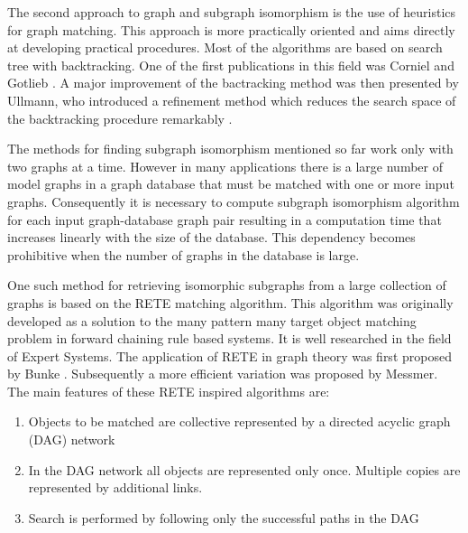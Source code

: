The second approach to graph and subgraph isomorphism is the use of heuristics for graph matching. This approach is more practically oriented and aims 
directly at developing practical procedures. Most of the algorithms are based on search tree with backtracking. One of the first publications in this 
field was Corniel and Gotlieb \cite{corneil1970}. A major improvement of the bactracking method was then presented by Ullmann, who introduced  a refinement 
method which reduces the search space of the backtracking procedure remarkably \cite{ullmann1976}.

The methods for finding subgraph isomorphism mentioned so far work only with two graphs at a time. However in many applications there is a large number of model graphs in a graph database that must be matched with one or more input graphs. Consequently it is necessary to compute subgraph isomorphism algorithm for each input graph-database graph pair resulting in a computation time that increases linearly with the size of the database. This dependency becomes prohibitive when the number of graphs in the database is large.  


One such method for retrieving  isomorphic subgraphs from a large collection of graphs is based on the RETE matching algorithm. This algorithm was originally developed as a solution to the many pattern many target object matching problem in forward chaining rule based systems. It is well researched in the field of Expert Systems. The application of RETE in graph theory was first proposed by Bunke \cite{bunke_glauser_tran1991}. Subsequently a more efficient variation was proposed by Messmer\cite{messmer_bunke2000}. The main features of these RETE inspired algorithms are: 

\begin{enumerate}
\item Objects to be matched are collective represented by a directed acyclic graph (DAG) network
\item In the DAG network  all objects are represented only once. Multiple copies are represented by additional links.
\item Search is performed by following only the successful paths in the DAG 
\end{enumerate}
 
